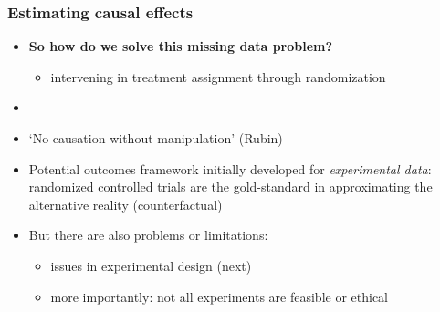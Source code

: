 \documentclass[aspectratio=43]{beamer}
\begin{document}
\begin{frame}
\frametitle{Estimating causal effects}
\centering

\begin{itemize}
  \item \textbf{So how do we solve this missing data problem?}
  \begin{itemize}
    \item intervening in treatment assignment through randomization
  \end{itemize}
  \item[]
  \item<2-> `No causation without manipulation' (Rubin)
  \item<2-> Potential outcomes framework initially developed for \textit{experimental data}: randomized controlled trials are the gold-standard in approximating the alternative reality (counterfactual)
  \item<2-> But there are also problems or limitations:
  \begin{itemize}
    \item issues in experimental design (next)
    \item more importantly: not all experiments are feasible or ethical
  \end{itemize}
\end{itemize}

\end{frame}

%
%
\end{document}
